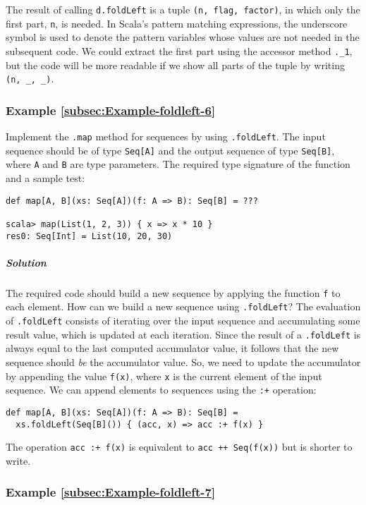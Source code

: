 \noindent The result of calling \lstinline!d.foldLeft! is a tuple
\lstinline!(n, flag, factor)!, in which only the first part, \lstinline!n!,
is needed. In Scala's pattern matching expressions, the underscore
symbol is used to denote the pattern variables whose values are not
needed in the subsequent code. We could extract the first part using
the accessor method \lstinline!._1!, but the code will be more readable
if we show all parts of the tuple by writing \lstinline!(n, _, _)!.

\subsubsection{Example \label{subsec:Example-foldleft-6}\ref{subsec:Example-foldleft-6}}

Implement the \lstinline!.map! method for sequences by using \lstinline!.foldLeft!.
The input sequence should be of type \lstinline!Seq[A]! and the output
sequence of type \lstinline!Seq[B]!, where \lstinline!A! and \lstinline!B!
are type parameters. The required type signature of the function and
a sample test:
\begin{lstlisting}
def map[A, B](xs: Seq[A])(f: A => B): Seq[B] = ???

scala> map(List(1, 2, 3)) { x => x * 10 }
res0: Seq[Int] = List(10, 20, 30)
\end{lstlisting}


\subparagraph{Solution}

The required code should build a new sequence by applying the function
\lstinline!f! to each element. How can we build a new sequence using
\lstinline!.foldLeft!? The evaluation of \lstinline!.foldLeft! consists
of iterating over the input sequence and accumulating some result
value, which is updated at each iteration. Since the result of a \lstinline!.foldLeft!
is always equal to the last computed accumulator value, it follows
that the new sequence should \emph{be} the accumulator value. So,
we need to update the accumulator by appending the value \lstinline!f(x)!,
where \lstinline!x! is the current element of the input sequence.
We can append elements to sequences using the \lstinline!:+! operation:
\begin{lstlisting}
def map[A, B](xs: Seq[A])(f: A => B): Seq[B] =
  xs.foldLeft(Seq[B]()) { (acc, x) => acc :+ f(x) }
\end{lstlisting}
The operation \lstinline!acc :+ f(x)! is equivalent to \lstinline!acc ++ Seq(f(x))!
but is shorter to write.

\subsubsection{Example \label{subsec:Example-foldleft-7}\ref{subsec:Example-foldleft-7}}

